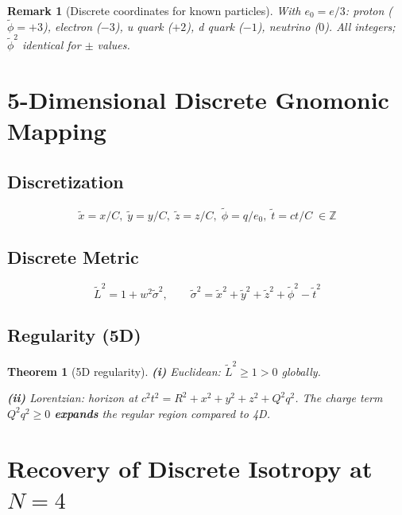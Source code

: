 \documentclass[12pt,a4paper]{article}
\newtheorem{theorem}{Theorem}[section]
\newtheorem*{remark}{Remark}
\begin{document}
\begin{remark}[Discrete coordinates for known particles]
With $e_0 = e/3$: proton ($\tilde{\phi}=+3$), electron ($-3$), u quark ($+2$), d quark ($-1$), neutrino ($0$). All integers; $\tilde{\phi}^2$ identical for $\pm$ values.
\end{remark}

\section{5-Dimensional Discrete Gnomonic Mapping}

\subsection{Discretization}

\begin{equation}
\tilde{x} = x/C,\; \tilde{y} = y/C,\; \tilde{z} = z/C,\; \tilde{\phi} = q/e_0,\; \tilde{t} = ct/C \;\in \mathbb{Z} \tag{4.1}
\end{equation}

\subsection{Discrete Metric}

\begin{equation}
\tilde{L}^2 = 1 + w^2\tilde{\sigma}^2, \qquad \tilde{\sigma}^2 = \tilde{x}^2 + \tilde{y}^2 + \tilde{z}^2 + \tilde{\phi}^2 - \tilde{t}^2 \tag{4.2}
\end{equation}

\subsection{Regularity (5D)}

\begin{theorem}[5D regularity]\label{thm:5dreg}
\textbf{(i)} Euclidean: $\tilde{L}^2 \geq 1 > 0$ globally.

\textbf{(ii)} Lorentzian: horizon at $c^2t^2 = R^2 + x^2 + y^2 + z^2 + Q^2q^2$. The charge term $Q^2q^2 \geq 0$ \textbf{expands} the regular region compared to 4D.
\end{theorem}

\section{Recovery of Discrete Isotropy at $N=4$}
\end{document}
